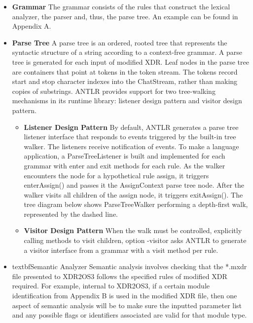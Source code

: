 \begin{itemize}
\item \textbf{Grammar} The grammar consists of the rules that construct the lexical analyzer,
  the parser and, thus, the parse tree. An example can be found in Appendix A.

\item \textbf{Parse Tree} A parse tree is an ordered, rooted tree that represents the syntactic
  structure of a string according to a context-free grammar. A parse tree is generated for each
  input of modified XDR. Leaf nodes in the parse tree are containers that point at tokens in the
  token stream. The tokens record start and stop character indexes into the ChatStream, rather
  than making copies of substrings. ANTLR provides support for two tree-walking mechanisms in
  its runtime library: listener design pattern and visitor design pattern.
  
  \begin{itemize}
  \item \textbf{Listener Design Pattern} By default, ANTLR generates a parse tree listener
    interface that responds to events triggered by the built-in tree walker. The listeners
    receive notification of events. To make a language application, a ParseTreeListener is built
    and implemented for each grammar with enter and exit methods for each rule. As the walker
    encounters the node for a hypothetical rule assign, it triggers enterAssign() and passes it
    the AssignContext parse tree node. After the walker visits all children of the assign node,
    it triggers exitAssign(). The tree diagram below shows ParseTreeWalker performing a
    depth-first walk, represented by the dashed line.

  \item \textbf{Visitor Design Pattern} When the walk must be controlled, explicitly calling
    methods to visit children, option -visitor asks ANTLR to generate a visitor interface from a
    grammar with a visit method per rule.
  \end{itemize}

\item textbf{Semantic Analyzer} Semantic analysis involves checking that the *.mxdr file
  presented to XDR2OS3 follows the specified rules of modified XDR required. For example,
  internal to XDR2OS3, if a certain module identification from Appendix B is used in the
  modified XDR file, then one aspect of semantic analysis will be to make sure the inputted
  parameter list and any possible flags or identifiers associated are valid for that module
  type.


\end{itemize}
